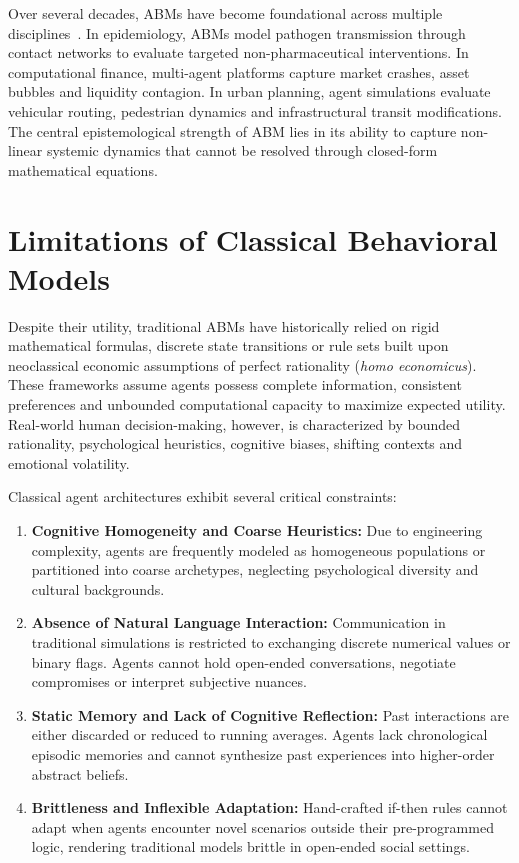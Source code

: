 \documentclass[12pt,a4paper]{report}
\begin{document}
Over several decades, ABMs have become foundational across multiple disciplines~\cite{axtell2002why}. In epidemiology, ABMs model pathogen transmission through contact networks to evaluate targeted non-pharmaceutical interventions. In computational finance, multi-agent platforms capture market crashes, asset bubbles and liquidity contagion. In urban planning, agent simulations evaluate vehicular routing, pedestrian dynamics and infrastructural transit modifications. The central epistemological strength of ABM lies in its ability to capture non-linear systemic dynamics that cannot be resolved through closed-form mathematical equations.

\section{Limitations of Classical Behavioral Models}
\label{sec:limitations}

Despite their utility, traditional ABMs have historically relied on rigid mathematical formulas, discrete state transitions or rule sets built upon neoclassical economic assumptions of perfect rationality (\textit{homo economicus}). These frameworks assume agents possess complete information, consistent preferences and unbounded computational capacity to maximize expected utility. Real-world human decision-making, however, is characterized by bounded rationality, psychological heuristics, cognitive biases, shifting contexts and emotional volatility.

Classical agent architectures exhibit several critical constraints:
\begin{enumerate}[label=\arabic*.]
    \item \textbf{Cognitive Homogeneity and Coarse Heuristics:} Due to engineering complexity, agents are frequently modeled as homogeneous populations or partitioned into coarse archetypes, neglecting psychological diversity and cultural backgrounds.
    \item \textbf{Absence of Natural Language Interaction:} Communication in traditional simulations is restricted to exchanging discrete numerical values or binary flags. Agents cannot hold open-ended conversations, negotiate compromises or interpret subjective nuances.
    \item \textbf{Static Memory and Lack of Cognitive Reflection:} Past interactions are either discarded or reduced to running averages. Agents lack chronological episodic memories and cannot synthesize past experiences into higher-order abstract beliefs.
    \item \textbf{Brittleness and Inflexible Adaptation:} Hand-crafted if-then rules cannot adapt when agents encounter novel scenarios outside their pre-programmed logic, rendering traditional models brittle in open-ended social settings.
\end{enumerate}
\end{document}
